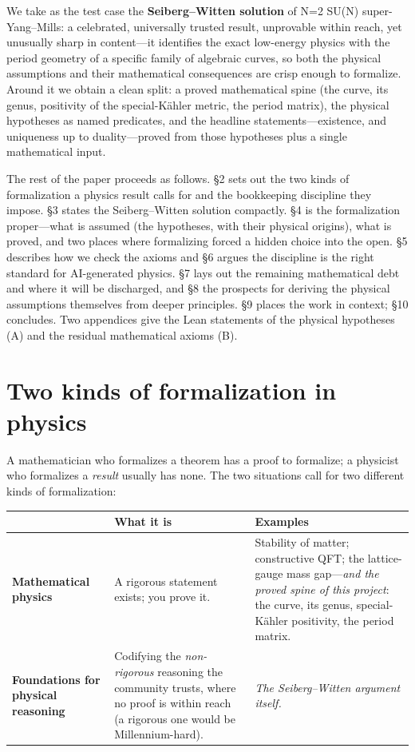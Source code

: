 \documentclass[11pt]{article}
\begin{document}
We take as the test case the \textbf{Seiberg--Witten solution} of N=2 SU(N) super-Yang--Mills: a
celebrated, universally trusted result, unprovable within reach, yet unusually sharp in
content---it identifies the exact low-energy physics with the period geometry of a specific family
of algebraic curves, so both the physical assumptions and their mathematical consequences are crisp
enough to formalize. Around it we obtain a clean split: a proved mathematical spine (the curve, its
genus, positivity of the special-K\"ahler metric, the period matrix), the physical hypotheses as
named predicates, and the headline statements---existence, and uniqueness up to duality---proved
from those hypotheses plus a single mathematical input.

The rest of the paper proceeds as follows. \S2 sets out the two kinds of formalization a physics
result calls for and the bookkeeping discipline they impose. \S3 states the Seiberg--Witten solution
compactly. \S4 is the formalization proper---what is assumed (the hypotheses, with their physical
origins), what is proved, and two places where formalizing forced a hidden choice into the open.
\S5 describes how we check the axioms and \S6 argues the discipline is the right standard for
AI-generated physics. \S7 lays out the remaining mathematical debt and where it will be discharged,
and \S8 the prospects for deriving the physical assumptions themselves from deeper principles. \S9
places the work in context; \S10 concludes. Two appendices give the Lean statements of the physical
hypotheses (A) and the residual mathematical axioms (B).

\section{Two kinds of formalization in physics}

A mathematician who formalizes a theorem has a proof to formalize; a physicist who formalizes a
\emph{result} usually has none. The two situations call for two different kinds of formalization:

\begin{center}
\renewcommand{\arraystretch}{1.3}
\begin{tabular}{@{}p{}p{}p{}@{}}
\hline
& \textbf{What it is} & \textbf{Examples} \\
\hline
\textbf{Mathematical physics} & A rigorous statement exists; you prove it. & Stability of
matter; constructive QFT; the lattice-gauge mass gap---\emph{and the proved spine of this
project}: the curve, its genus, special-K\"ahler positivity, the period matrix. \\
\textbf{Foundations for physical reasoning} & Codifying the \emph{non-rigorous} reasoning the
community trusts, where no proof is within reach (a rigorous one would be Millennium-hard). &
\emph{The Seiberg--Witten argument itself.} \\
\hline
\end{tabular}
\end{center}
\end{document}
